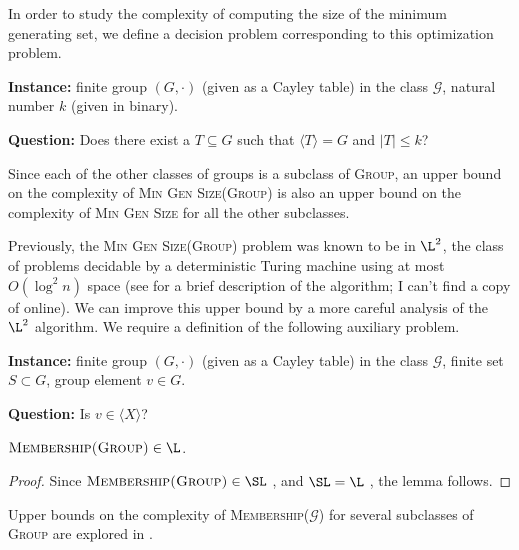 \documentclass{article}
\newcommand{\gen}[1]{{\langle #1 \rangle}}
\begin{document}
In order to study the complexity of computing the size of the minimum generating set, we define a decision problem corresponding to this optimization problem.

\begin{definition}
  \mbox{}

  \textbf{Instance:} finite group $(G, \cdot)$ (given as a Cayley table) in the class $\mathcal{G}$, natural number $k$ (given in binary).

  \textbf{Question:} Does there exist a $T \subseteq G$ such that $\gen{T} = G$ and $|T| \leq k$?
\end{definition}

Since each of the other classes of groups is a subclass of \textsc{Group}, an upper bound on the complexity of \textsc{Min Gen Size(Group)} is also an upper bound on the complexity of \textsc{Min Gen Size} for all the other subclasses.

Previously, the \textsc{Min Gen Size(Group)} problem was known to be in $\L^2$, the class of problems decidable by a deterministic Turing machine using at most $O(\log^2 n)$ space \cite{lsz77} (see \cite[Proposition~3]{at06} for a brief description of the algorithm; I can't find a copy of \cite{lsz77} online).
We can improve this upper bound by a more careful analysis of the $\L^2$ algorithm.
We require a definition of the following auxiliary problem.

\begin{definition}
  \mbox{}

  \textbf{Instance:} finite group $(G, \cdot)$ (given as a Cayley table) in the class $\mathcal{G}$, finite set $S \subset G$, group element $v \in G$.

  \textbf{Question:} Is $v \in \gen{X}$?
\end{definition}

\begin{lemma}\label{lem:membershipinl}
  $\textsc{Membership(Group)} \in \L$.
\end{lemma}
\begin{proof}
  Since $\textsc{Membership(Group)} \in \SL$ \cite[Section~3]{bm89}, and $\SL = \L$ \cite{reingold08}, the lemma follows.
\end{proof}

Upper bounds on the complexity of \textsc{Membership($\mathcal{G}$)} for several subclasses of \textsc{Group} are explored in \cite{bklm01}.
\end{document}
